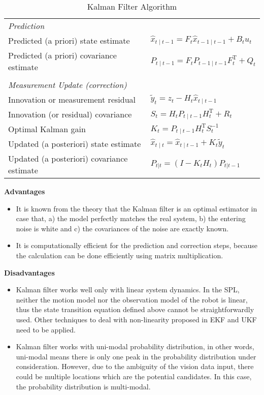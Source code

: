 \begin{table}[h!]
\begin{adjustbox}{max width=\textwidth}
  \centering
  \begin{tabular}{ll}
 \textit{Prediction} & \\
Predicted (a priori) state estimate & $\hat{x}_{t\mid t-1} = F_{t}\hat{x}_{t-1\mid t-1} + B_{t} u_{t}$ \\
Predicted (a priori) covariance estimate & $P_{t\mid t-1} =  F_{t} P_{t-1\mid t-1} F_{t}^{\text{T}} + Q_{t}$\\
&\\
\textit{Measurement Update (correction)} & \\
Innovation or measurement residual & $\tilde{y}_t = z_t - H_t\hat{x}_{t\mid t-1}$ \\
Innovation (or residual) covariance & $S_t = H_t P_{t\mid t-1} H_t^\text{T} + R_t$ \\
Optimal Kalman gain & $K_t = P_{t\mid t-1}H_t^\text{T}S_t^{-1}$ \\
Updated (a posteriori) state estimate & $\hat{x}_{t\mid t} = \hat{x}_{t\mid t-1} + K_t\tilde{y}_t$ \\
Updated (a posteriori) covariance estimate & $P_{t|t} = (I - K_t H_t) P_{t|t-1}$ \\
  \end{tabular}
  \end{adjustbox}
  \caption{Kalman Filter Algorithm}
  \label{tab:kf}
\end{table}

\noindent\textbf{Advantages}
\begin{itemize}
  \item  It is known from the theory that the Kalman filter is an optimal estimator in case that, a) the model perfectly matches the real system, b) the entering noise is white and c) the covariances of the noise are exactly known.
  \item  It is computationally efficient for the prediction and correction steps, because the calculation can be done efficiently using matrix multiplication.
\end{itemize}

\noindent\textbf{Disadvantages}
\begin{itemize}
  \item  Kalman filter works well only with linear system dynamics. In the SPL, neither the motion model nor the observation model of the robot is linear, thus the state transition equation defined above cannot be straightforwardly used. Other techniques to deal with non-linearity proposed in \gls{EKF} and \gls{UKF} need to be applied.
  \item  Kalman filter works with uni-modal probability distribution, in other words, uni-modal means there is only one peak in the probability distribution under consideration. However, due to the ambiguity of the vision data input, there could be multiple locations which are the potential candidates. In this case, the probability distribution is multi-modal.
\end{itemize}

